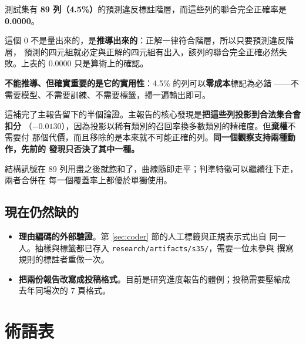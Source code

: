 \documentclass[11pt,a4paper]{ctexart}
\begin{document}
\begin{tcolorbox}[colback=green!5, colframe=green!45, title=同一個觀察支持一個壞動作與一個好動作]
測試集有 \textbf{89 列（4.5\%）}的預測違反標註階層，而這些列的聯合完全正確率是
\textbf{0.0000}。

\medskip
這個 0 不是量出來的，是\textbf{推導出來的}：正解一律符合階層，所以只要預測違反階層，
預測的四元組就必定與正解的四元組有出入，該列的聯合完全正確必然失敗。上表的 0.0000
只是算術上的確認。

\medskip
\textbf{不能推導、但確實重要的是它的實用性}：4.5\% 的列可以\textbf{零成本}標記為必錯
——不需要模型、不需要訓練、不需要標籤，掃一遍輸出即可。

\medskip
這補完了主報告留下的半個論證。主報告的核心發現是\textbf{把這些列投影到合法集合會扣分}
（$-0.0130$），因為投影以稀有類別的召回率換多數類別的精確度。但\textbf{棄權}不需要付
那個代價，而且移除的是本來就不可能正確的列。\textbf{同一個觀察支持兩種動作，先前的
發現只否決了其中一種。}
\end{tcolorbox}

結構訊號在 89 列用盡之後就飽和了，曲線隨即走平；判準特徵可以繼續往下走，兩者合併在
每一個覆蓋率上都優於單獨使用。

\subsection{現在仍然缺的}

\begin{itemize}[leftmargin=2em, itemsep=4pt]
  \item \textbf{理由編碼的外部驗證}。第 \ref{sec:coder} 節的人工標籤與正規表示式出自
        同一人。抽樣與標籤都已存入 \texttt{research/artifacts/s35/}，需要一位未參與
        撰寫規則的標註者重做一次。
  \item \textbf{把兩份報告改寫成投稿格式}。目前是研究進度報告的體例；投稿需要壓縮成
        去年同場次的 7 頁格式。
\end{itemize}

\section{術語表}
\label{sec:glossary}
\end{document}
